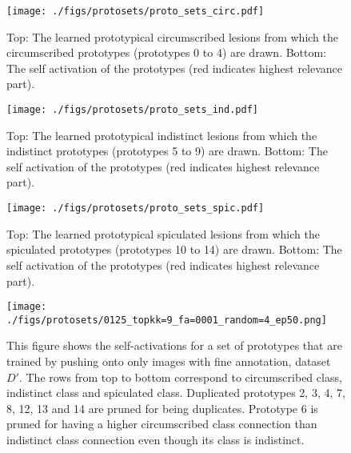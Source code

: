 \documentclass[11pt]{article}
\begin{document}
\begin{figure}[h]
        \begin{center}
            \texttt{[image: ./figs/protosets/proto\_sets\_circ.pdf]}
        \end{center}
        \vfill
           \caption{Top: The learned prototypical circumscribed lesions from which the circumscribed prototypes (prototypes 0 to 4) are drawn. Bottom: The self activation of the prototypes (red indicates highest relevance part).}
        \label{fig:protos_pushed_on_all_circ}
\end{figure}
\begin{figure}[h]
        \begin{center}
            \texttt{[image: ./figs/protosets/proto\_sets\_ind.pdf]}
        \end{center}
        \vfill
           \caption{Top: The learned prototypical indistinct lesions from which the indistinct prototypes (prototypes 5 to 9) are drawn. Bottom: The self activation of the prototypes (red indicates highest relevance part).}
        \label{fig:protos_pushed_on_all_ind}
\end{figure}
\begin{figure}[h]
        \begin{center}
            \texttt{[image: ./figs/protosets/proto\_sets\_spic.pdf]}
        \end{center}
        \vfill
           \caption{Top: The learned prototypical spiculated lesions from which the spiculated prototypes (prototypes 10 to 14) are drawn. Bottom: The self activation of the prototypes (red indicates highest relevance part).}
        \label{fig:protos_pushed_on_all_spic}
\end{figure}
\begin{figure}[h]
        \begin{center}
            \texttt{[image: ./figs/protosets/0125\_topkk=9\_fa=0001\_random=4\_ep50.png]}
        \end{center}
        \vfill
           \caption{This figure shows the self-activations for a set of prototypes that are trained by pushing onto only images with fine annotation, dataset $D'$. The rows from top to bottom correspond to circumscribed class, indistinct class and spiculated class. Duplicated prototypes 2, 3, 4, 7, 8, 12, 13 and 14 are pruned for being duplicates. Prototype 6 is pruned for having a higher circumscribed class connection than indistinct class connection even though its class is indistinct.}
        \label{fig:protos_pushed_on_fine}
\end{figure}
\FloatBarrier
\end{document}
